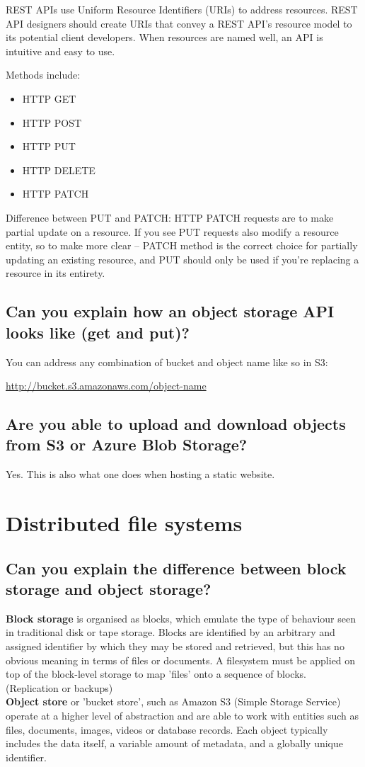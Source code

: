 \documentclass{article}
\begin{document}
REST APIs use Uniform Resource Identifiers (URIs) to address resources. REST API designers should create URIs that convey a REST API's resource model to its potential client developers. When resources are named well, an API is intuitive and easy to use.

Methods include:
\begin{itemize}
\item HTTP GET
\item HTTP POST
\item HTTP PUT
\item HTTP DELETE
\item HTTP PATCH
\end{itemize}

Difference between PUT and PATCH: HTTP PATCH requests are to make partial update on a resource. If you see PUT requests also modify a resource entity, so to make more clear – PATCH method is the correct choice for partially updating an existing resource, and PUT should only be used if you’re replacing a resource in its entirety.

\subsection{Can you explain how an object storage API looks like (get and put)?}

You can address any combination of bucket and object name like so in S3:

\url{http://bucket.s3.amazonaws.com/object-name}

\subsection{Are you able to upload and download objects from S3 or Azure Blob Storage?}

Yes. This is also what one does when hosting a static website.

\pagebreak

\section{Distributed file systems}
\subsection{Can you explain the difference between block storage and object storage?}

\textbf{Block storage} is organised as blocks, which emulate the type of behaviour seen in traditional disk or tape storage. Blocks are identified by an arbitrary and assigned identifier by which they may be stored and retrieved, but this has no obvious meaning in terms of files or documents. A filesystem must be applied on top of the block-level storage to map 'files' onto a sequence of blocks. (Replication or backups)\\
\textbf{Object store} or 'bucket store', such as Amazon S3 (Simple Storage Service) operate at a higher level of abstraction and are able to work with entities such as files, documents, images, videos or database records. Each object typically includes the data itself, a variable amount of metadata, and a globally unique identifier.
\end{document}
